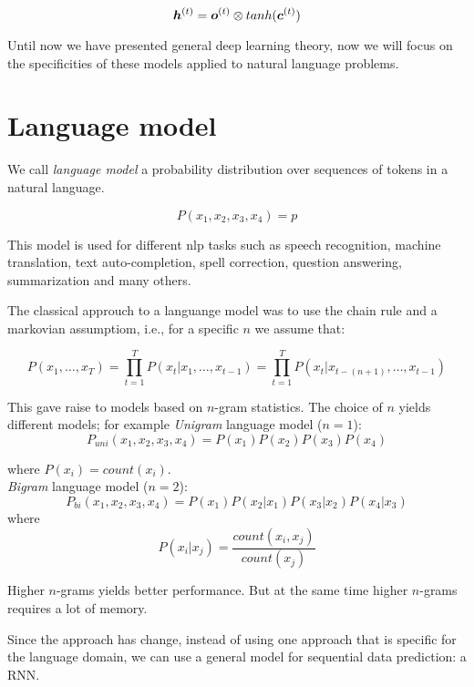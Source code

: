 \begin{equation}
\bm{h}^{(t)} = \bm{o}^{(t)} \otimes tanh(\bm{c}^{(t)})
\end{equation}


Until now we have presented general deep learning theory, now we will focus on the specificities of these models applied to natural language problems.


\section{Language model}

We call \textit{language model} a probability distribution over sequences of tokens in a natural language.

\[
P(x_1,x_2,x_3,x_4) = p
\]

This model is used for different nlp tasks such as speech recognition, machine translation, text auto-completion, spell correction, question answering, summarization and many others.

The classical approuch to a languange model was to use the chain rule and a markovian assumptiom, i.e., for a specific $n$ we assume that:

\begin{equation}
P(x_1, \dots, x_T) = \prod_{t=1}^{T} P(x_t \vert x_1, \dots, x_{t-1}) = \prod_{t=1}^{T} P(x_{t} \vert x_{t - (n+1)}, \dots, x_{t-1})
\end{equation} 


This gave raise to models based on $n$-gram statistics. The choice of $n$ yields different models; for example 
\textit{Unigram} language model ($n=1$): 
\begin{equation}
P_{uni}(x_1, x_2, x_3, x_4) = P(x_1)P(x_2)P(x_3)P(x_4)
\end{equation}

where $P(x_i) = count(x_i)$.\\

\textit{Bigram} language model ($n=2$): 
\begin{equation}
P_{bi}(x_1,x_2,x_3,x_4) = P(x_1)P(x_2\vert x_1)P(x_3\vert x_2)P(x_4\vert x_3)
\end{equation} 
where
\[
P(x_i\vert x_j) = \frac{count(x_i, x_j)}{count(x_j)}
\]


Higher $n$-grams yields better performance. But at the same time higher $n$-grams requires a lot of memory\cite{Heafield}.

Since \cite{Mikolov11} the approach has change, instead of using one approach that is specific for the language domain, we can use a general model for sequential data prediction: a RNN.


